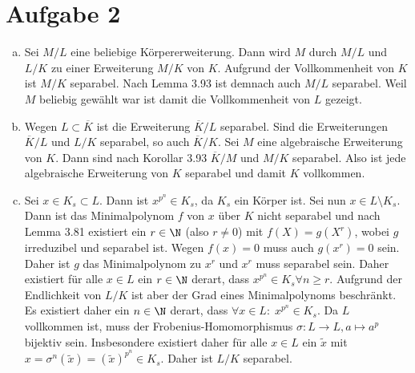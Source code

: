 \documentclass{article}
\begin{document}
    \section*{Aufgabe 2}
    \begin{enumerate}[(a)]
        \item Sei $M/L$ eine beliebige Körpererweiterung. Dann wird $M$ durch $M/L$ und $L/K$ zu einer Erweiterung $M/K$ von $K$. Aufgrund der Vollkommenheit von $K$ ist $M/K$ separabel.
        Nach Lemma 3.93 ist demnach auch $M/L$ separabel. Weil $M$ beliebig gewählt war ist damit die Vollkommenheit von $L$ gezeigt.
        \item Wegen $L \subset \overline{K}$ ist die Erweiterung $\overline{K}/L$ separabel. Sind die Erweiterungen $\overline{K}/L$ und $L/K$ separabel, so auch $\overline{K}/K$.
        Sei $M$ eine algebraische Erweiterung von $K$. Dann sind nach Korollar 3.93 $\overline{K}/M$ und $M/K$ separabel. Also ist jede algebraische Erweiterung von $K$ separabel und damit $K$ vollkommen.
        \item Sei $x \in K_s\subset L$. Dann ist $x^{p^n} \in K_s$, da $K_s$ ein Körper ist. Sei nun $x \in L\setminus K_s$. Dann ist das Minimalpolynom $f$ von $x$ über $K$ nicht separabel
        und nach Lemma 3.81 existiert ein $r \in \N$ (also $r \neq 0$) mit $f(X) = g(X^r)$, wobei $g$ irreduzibel und separabel ist. Wegen $f(x) = 0$ muss auch $g(x^r) = 0$ sein. 
        Daher ist $g$ das Minimalpolynom zu $x^r$ und $x^r$ muss separabel sein. Daher existiert für alle $x\in L$ ein $r \in \N$ derart, dass $x^{p^n} \in K_s \forall n \geq r$. 
        Aufgrund der Endlichkeit von $L/K$ ist aber der Grad eines Minimalpolynoms beschränkt.
        Es existiert daher ein $n\in \N$ derart, dass $\forall x \in L\colon\; x^{p^n} \in K_s$. Da $L$ vollkommen ist, muss der Frobenius-Homomorphismus $\sigma\colon L\to L, a\mapsto a^p$ bijektiv sein.
        Insbesondere existiert daher für alle $x\in L$ ein $\tilde x$ mit $x = \sigma^n(\tilde x) = (\tilde x)^{p^n} \in K_s$. Daher ist $L/K$ separabel.
    \end{enumerate}
\end{document}
